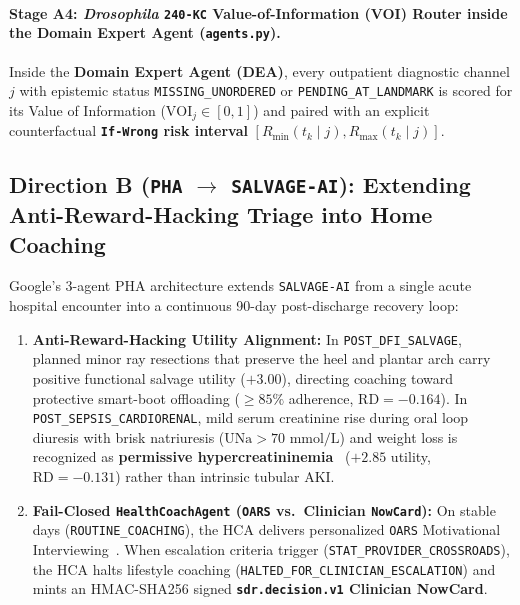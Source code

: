 \documentclass[10pt,twocolumn,letterpaper]{article}
\begin{document}
\paragraph{Stage A4: \textit{Drosophila} \texttt{240-KC} Value-of-Information (VOI) Router inside the Domain Expert Agent (\texttt{agents.py}).}
Inside the \textbf{Domain Expert Agent (DEA)}, every outpatient diagnostic channel $j$ with epistemic status \texttt{MISSING\_UNORDERED} or \texttt{PENDING\_AT\_LANDMARK} is scored for its Value of Information ($\text{VOI}_j \in [0, 1]$) and paired with an explicit counterfactual \textbf{\texttt{If-Wrong} risk interval} $[R_{\min}(t_k \mid j), R_{\max}(t_k \mid j)]$.

\subsection{Direction B (\texttt{PHA} $\rightarrow$ \texttt{SALVAGE-AI}): Extending Anti-Reward-Hacking Triage into Home Coaching}

Google's 3-agent PHA architecture extends \texttt{SALVAGE-AI} from a single acute hospital encounter into a continuous 90-day post-discharge recovery loop:
\begin{enumerate}
    \item \textbf{Anti-Reward-Hacking Utility Alignment:} In \texttt{POST\_DFI\_SALVAGE}, planned minor ray resections that preserve the heel and plantar arch carry positive functional salvage utility ($+3.00$), directing coaching toward protective smart-boot offloading ($\ge 85\%$ adherence, $\text{RD} = -0.164$). In \texttt{POST\_SEPSIS\_CARDIORENAL}, mild serum creatinine rise during oral loop diuresis with brisk natriuresis ($\text{UNa} > 70\text{ mmol/L}$) and weight loss is recognized as \textbf{permissive hypercreatininemia}~\cite{testani2010potential,bozkurt2023diuretic} ($+2.85$ utility, $\text{RD} = -0.131$) rather than intrinsic tubular AKI.
    \item \textbf{Fail-Closed \texttt{HealthCoachAgent} (\texttt{OARS} vs.\ Clinician \texttt{NowCard}):} On stable days (\texttt{ROUTINE\_COACHING}), the HCA delivers personalized \texttt{OARS} Motivational Interviewing~\cite{miller2012motivational}. When escalation criteria trigger (\texttt{STAT\_PROVIDER\_CROSSROADS}), the HCA halts lifestyle coaching (\texttt{HALTED\_FOR\_CLINICIAN\_ESCALATION}) and mints an HMAC-SHA256 signed \textbf{\texttt{sdr.decision.v1} Clinician NowCard}.
\end{enumerate}
\end{document}
